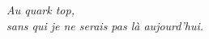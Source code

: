 \begingroup
{}
\let\clearpage\relax
\let\cleardoublepage\relax
\let\cleardoublepage\relax

\vspace*{\fill}
\begin{flushright}{\slshape
    Au quark top,\\
    sans qui je ne serais pas là aujourd'hui.}
\end{flushright}
\vspace*{\fill}
\endgroup